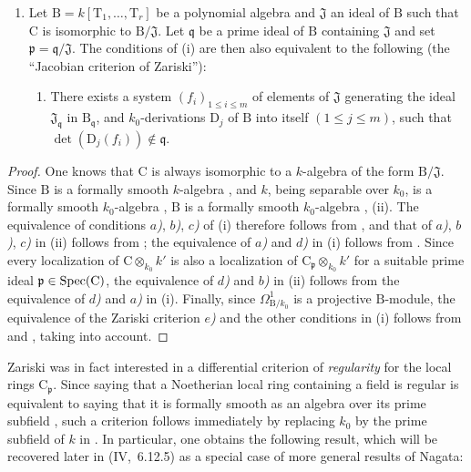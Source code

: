 \begin{proposition}[22.6.7]
\begin{enumerate}
  \item[\rm{(iii)}] Let
  $\mathrm{B}=k[\mathrm{T}_1,\ldots,\mathrm{T}_r]$ be a polynomial algebra and
  $\mathfrak{J}$ an ideal of $\mathrm{B}$ such that $\mathrm{C}$ is
  isomorphic to $\mathrm{B}/\mathfrak{J}$. Let $\mathfrak{q}$ be a prime
  ideal of $\mathrm{B}$ containing $\mathfrak{J}$ and set
  $\mathfrak{p}=\mathfrak{q}/\mathfrak{J}$. The conditions of \textup{(i)} are then
  also equivalent to the following \textup{(the ``Jacobian criterion of Zariski'')}:
  \begin{enumerate}
    \item[\textup{e)}] There exists a system $(f_i)_{1\leq i\leq m}$ of elements of
    $\mathfrak{J}$ generating the ideal $\mathfrak{J}_\mathfrak{q}$ in
    $\mathrm{B}_\mathfrak{q}$, and $k_0$-derivations $\mathrm{D}_j$ of
    $\mathrm{B}$ into itself $(1\leq j\leq m)$, such that
    $\det(\mathrm{D}_j(f_i))\notin\mathfrak{q}$.
  \end{enumerate}
\end{enumerate}
\end{proposition}

\begin{proof}
One knows that $\mathrm{C}$ is always isomorphic to a $k$-algebra of the form
$\mathrm{B}/\mathfrak{J}$. Since $\mathrm{B}$ is a formally smooth
$k$-algebra , and $k$, being separable over $k_0$, is a
formally smooth $k_0$-algebra , $\mathrm{B}$ is a formally
smooth $k_0$-algebra , (ii). The equivalence of conditions
\emph{$a$)}, \emph{$b$)}, \emph{$c$)} of (i) therefore follows from , and that of
\emph{$a$)}, \emph{$b$)}, \emph{$c$)} in (ii) follows from ; the equivalence of
\emph{$a$)} and \emph{$d$)} in (i) follows from . Since every localization
of $\mathrm{C}\otimes_{k_0}k'$ is also a localization of
$\mathrm{C}_\mathfrak{p}\otimes_{k_0}k'$ for a suitable prime ideal
$\mathfrak{p}\in\operatorname{Spec}(\mathrm{C})$, the equivalence of \emph{$d$)} and \emph{$b$)} in (ii)
follows from the equivalence of \emph{$d$)} and \emph{$a$)} in (i). Finally, since
$\Omega^1_{\mathrm{B}/k_0}$ is a projective $\mathrm{B}$-module, the
equivalence of the Zariski criterion \emph{$e$)} and the other conditions in (i)
follows from  and , taking
 into account.
\end{proof}

Zariski was in fact interested in a differential criterion of \emph{regularity} for
the local rings $\mathrm{C}_\mathfrak{p}$. Since saying that a Noetherian
local ring containing a field is regular is equivalent to saying that it is
formally smooth as an algebra over its prime subfield , such a
criterion follows immediately by replacing $k_0$ by the prime subfield of
$k$ in . In particular, one obtains the following result,
which will be recovered later in (IV,~6.12.5) as a special case of more
general results of Nagata:

